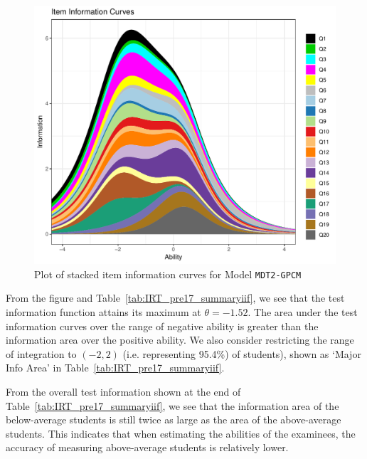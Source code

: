 \documentclass[a4paper]{report}
\begin{document}

\begin{figure}[H]
  \centering
  \includegraphics[width=\linewidth]{fig/IRT_pre17_GPCM_stackinfo.pdf}
  \caption{\label{fig:IRT_pre17_GPCM_stackinfo}Plot of stacked item information curves for Model \texttt{MDT2-GPCM}}
\end{figure}

From the figure and Table~\ref{tab:IRT_pre17_summaryiif}, we see that the test information function attains its maximum at $\theta=-1.52$. The area under the test information curves over the range of negative ability is greater than the information area over the positive ability. We also consider restricting the range of integration to $(-2,2)$ (i.e. representing 95.4\%) of students), shown as `Major Info Area' in Table~\ref{tab:IRT_pre17_summaryiif}. %

From the overall test information shown at the end of Table~\ref{tab:IRT_pre17_summaryiif}, we see that the information area of the below-average students is still twice as large as the area of the above-average students. This indicates that when estimating the abilities of the examinees, the accuracy of measuring above-average students is relatively lower. 
\end{document}
